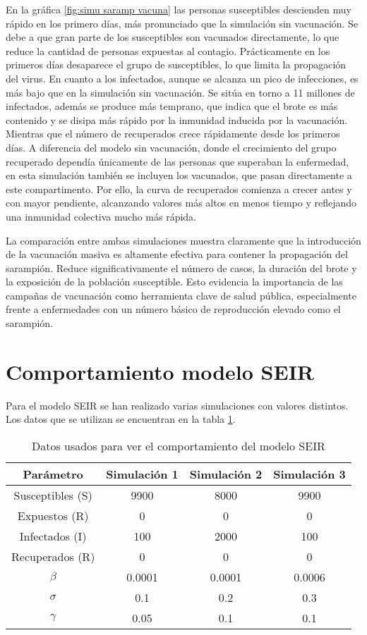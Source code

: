 En la gráfica \ref{fig:simu saramp vacuna} las personas susceptibles descienden muy rápido en los primero días, más pronunciado que la simulación sin vacunación. Se debe a que gran parte de los susceptibles son vacunados directamente, lo que reduce la cantidad de personas expuestas al contagio. Prácticamente en los primeros días desaparece el grupo de susceptibles, lo que limita la propagación del virus.
En cuanto a los infectados, aunque se alcanza un pico de infecciones, es más bajo que en la simulación sin vacunación. Se sitúa en torno a 11 millones de infectados, además se produce más temprano, que indica que el brote es más contenido y se disipa más rápido por la inmunidad inducida por la vacunación.
Mientras que el número de recuperados crece rápidamente desde los primeros días. A diferencia del modelo sin vacunación, donde el crecimiento del grupo recuperado dependía únicamente de las personas que superaban la enfermedad, en esta simulación también se incluyen los vacunados, que pasan directamente a este compartimento. Por ello, la curva de recuperados comienza a crecer antes y con mayor pendiente, alcanzando valores más altos en menos tiempo y reflejando una inmunidad colectiva mucho más rápida.

La comparación entre ambas simulaciones muestra claramente que la introducción de la vacunación masiva es altamente efectiva para contener la propagación del sarampión. Reduce significativamente el número de casos, la duración del brote y la exposición de la población susceptible. Esto evidencia la importancia de las campañas de vacunación como herramienta clave de salud pública, especialmente frente a enfermedades con un número básico de reproducción elevado como el sarampión.




\section{Comportamiento modelo SEIR}
Para el modelo SEIR se han realizado varias simulaciones con valores distintos. Los datos que se utilizan se encuentran en la tabla \ref{tab:datos para modelo SEIR}.

\begin{table}[H]
\centering
\begin{tabular}{|c|c|c|c|}
\hline
\textbf{Parámetro} & \textbf{Simulación 1} & \textbf{Simulación 2}  & \textbf{Simulación 3}\\
\hline
Susceptibles (S) & 9900 & 8000 & 9900\\
\hline
Expuestos (R)   &  0   & 0 & 0  \\
\hline
Infectados (I)   & 100   & 2000 & 100  \\
\hline
Recuperados (R)   &  0   & 0 & 0  \\
\hline
\(\beta\)        & 0.0001 & 0.0001  & 0.0006\\
\hline
\(\sigma\)        & 0.1 & 0.2  & 0.3\\
\hline
\(\gamma\)        & 0.05 & 0.1 & 0.1\\
\hline
\end{tabular}
\caption{Datos usados para ver el comportamiento del modelo SEIR}
\label{tab:datos para modelo SEIR}
\end{table}

